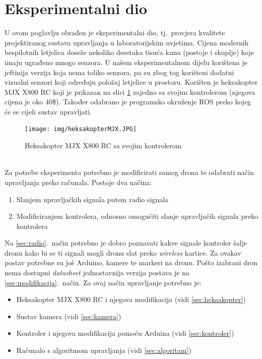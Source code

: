 \documentclass[times, utf8, diplomski]{fer}
\begin{document}
\section{Eksperimentalni dio}
U ovom poglavlju obrađen je eksperimentalni dio, tj.~provjera kvalitete projektiranog sustava upravljanja u laboratorijskim uvjetima. 
Cijena modernih bespilotnih letjelica doseže nekoliko desetaka tisuća kuna (postoje i skuplje) koje imaju ugrađeno mnogo senzora. U našem eksperimentalnom dijelu korištena je jeftinija verzija koja nema toliko senzora, pa su zbog tog korišteni dodatni vizualni senzori koji određuju položaj letjelice u prostoru. Korišten je heksakopter MJX X800 RC koji je prikazan na slici \ref{fig:MJX X800 RC} zajedno sa svojim kontrolerom (njegova cijena je oko 40\$). Također odabrano je programsko okruženje ROS preko kojeg će se cijeli sustav upravljati. 
\begin{figure}[htb]
\centering
\texttt{[image: img/heksakopterMJX.JPG]}
\caption{Heksakopter MJX X800 RC sa svojim kontrolerom}
\label{fig:MJX X800 RC}
\end{figure}\\
Za potrebe eksperimenta potrebno je modificirati samog drona te odabrati način upravljanja preko računala. Postoje dva načina:
\begin{enumerate}
\item Slanjem upravljačkih signala putem radio signala\label{sec:radio}
\item Modificiranjem kontrolera, odnosno omogućiti slanje upravljačih signala preko kontrolera\label{sec:modifikacija}
\end{enumerate}
Na \ref{sec:radio}.~način potrebno je dobro poznavati kakve signale kontroler šalje dronu kako bi se ti signali mogli dronu slat preko \emph{wireless} kartice. Za ovakav postav potrebne su još Arduino, kamere te markeri na dronu. Pošto izabrani dron nema dostupni \emph{datasheet} jednostavnija verzija postava je  na \ref{sec:modifikacija}.~način. Za ovaj način upravljanje potrebno je:
\begin{itemize}
\item Heksakopter MJX X800 RC i njegova modifikacija (vidi \ref{sec:heksakopter})
\item Sustav kamera (vidi \ref{sec:kamera})
\item Kontroler i njegova modifikacija pomoću Arduina (vidi \ref{sec:kontroler})
\item Računalo s algoritmom upravljanja (vidi \ref{sec:algoritam})
\end{itemize}
\end{document}
